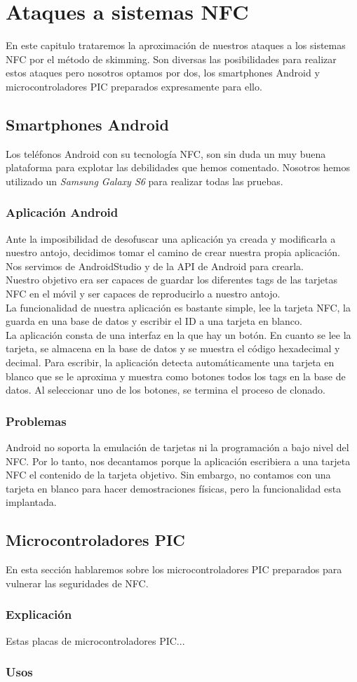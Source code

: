 \chapter{Ataques a sistemas NFC}\label{ch:ataques}
En este capitulo trataremos la aproximación de nuestros ataques a los sistemas NFC por el método de skimming. Son diversas las posibilidades para realizar estos ataques pero nosotros optamos por dos, los smartphones Android y microcontroladores PIC preparados expresamente para ello.
\clearpage

\section{Smartphones Android}
Los teléfonos Android con su tecnología NFC, son sin duda un muy buena plataforma para explotar las debilidades que hemos comentado. Nosotros hemos utilizado un \textit{Samsung Galaxy S6} para realizar todas las pruebas.

\subsection{Aplicación Android}
Ante la imposibilidad de desofuscar una aplicación ya creada y modificarla a nuestro antojo, decidimos tomar el camino de crear nuestra propia aplicación. Nos servimos de AndroidStudio y de la API de Android para crearla.\\
Nuestro objetivo era ser capaces de guardar los diferentes tags de las tarjetas NFC en el móvil y ser capaces de reproducirlo a nuestro antojo.\\
La funcionalidad de nuestra aplicación es bastante simple, lee la tarjeta NFC, la guarda en una base de datos y escribir el ID a una tarjeta en blanco.\\
La aplicación consta de una interfaz en la que hay un botón. En cuanto se lee la tarjeta, se almacena en la base de datos y se muestra el código hexadecimal y decimal. Para escribir, la aplicación detecta automáticamente una tarjeta en blanco que se le aproxima y muestra como botones todos los tags en la base de datos. Al seleccionar uno de los botones, se termina el proceso de clonado.

\subsection{Problemas}
Android no soporta la emulación de tarjetas ni la programación a bajo nivel del NFC. Por lo tanto, nos decantamos porque la aplicación escribiera a una tarjeta NFC el contenido de la tarjeta objetivo. Sin embargo, no contamos con una tarjeta en blanco para hacer demostraciones físicas, pero la funcionalidad esta implantada.

\section{Microcontroladores PIC}
En esta sección hablaremos sobre los microcontroladores PIC preparados para vulnerar las seguridades de NFC.
	\subsection{Explicación}
		Estas placas de microcontroladores PIC...
	
	\subsection{Usos}
